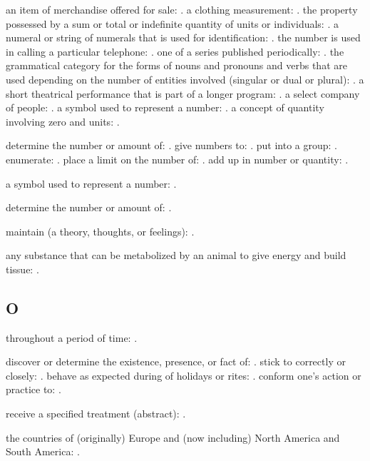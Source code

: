   an item of merchandise offered for sale: . a clothing measurement: . the property possessed by a sum or total or indefinite quantity of units or individuals: . a numeral or string of numerals that is used for identification: . the number is used in calling a particular telephone: . one of a series published periodically: . the grammatical category for the forms of nouns and pronouns and verbs that are used depending on the number of entities involved (singular or dual or plural): . a short theatrical performance that is part of a longer program: . a select company of people: . a symbol used to represent a number: . a concept of quantity involving zero and units: .

  determine the number or amount of: . give numbers to: . put into a group: . enumerate: . place a limit on the number of: . add up in number or quantity: .

  a symbol used to represent a number: .

  determine the number or amount of: .

  maintain (a theory, thoughts, or feelings): .

  any substance that can be metabolized by an animal to give energy and build tissue: .

\subsection*{O}

  throughout a period of time: .

  discover or determine the existence, presence, or fact of: . stick to correctly or closely: . behave as expected during of holidays or rites: . conform one's action or practice to: .

  receive a specified treatment (abstract): .

  the countries of (originally) Europe and (now including) North America and South America: .

